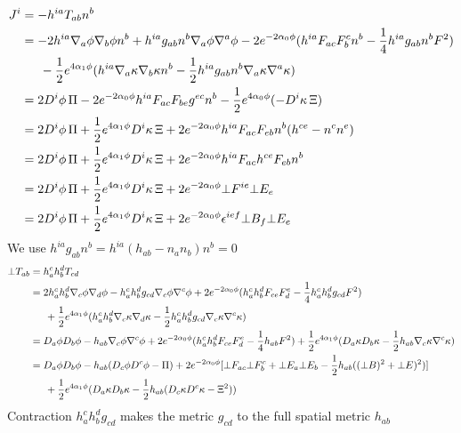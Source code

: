 \documentclass[prd]{revtex4}
\begin{document}
\begin{align}
J^i &= -h^{ia} T_{ab} n^b \nonumber \\
     &= - 2 h^{ia} \nabla_a \phi \nabla_b \phi n^b  + h^{ia} g_{ab} n^b \nabla_a \phi \nabla^a \phi - 2 e^{-2 \alpha_0 \phi} ( h^{ia} F_{ac} F_b^c n^b -\frac{1}{4} h^{ia} g_{ab} n^b F^2) \nonumber \\
     &\indent - \frac{1}{2} e^{4 \alpha_1 \phi} (h^{ia} \nabla_a \kappa \nabla_b \kappa n^b -\frac{1}{2} h^{ia} g_{ab} n^b \nabla_a \kappa \nabla^a \kappa) \nonumber \\
     &= 2 D^i \phi \, \Pi - 2 e^{-2 \alpha_0 \phi}  h^{ia} F_{ac} F_{be} g^{ec} n^b - \frac{1}{2} e^{4 \alpha_0 \phi} (- D^i \kappa \, \Xi) \nonumber \\     
          &= 2 D^i \phi\,  \Pi + \frac{1}{2} e^{4 \alpha_1 \phi} D^i \kappa \, \Xi + 2 e^{-2 \alpha_0 \phi}  h^{ia} F_{ac} F_{eb} n^b (h^{ce} - n^c n^e) \nonumber \\     
          &= 2 D^i \phi \, \Pi + \frac{1}{2} e^{4 \alpha_1 \phi} D^i \kappa \, \Xi + 2 e^{-2 \alpha_0 \phi}  h^{ia} F_{ac} h^{ce}  F_{eb} n^b \nonumber \\
          &= 2 D^i \phi \, \Pi + \frac{1}{2} e^{4 \alpha_1 \phi} D^i \kappa \, \Xi + 2 e^{-2 \alpha_0 \phi}  \bot F^{ie} \bot E_e \nonumber \\
                    &= 2 D^i \phi \,\Pi + \frac{1}{2} e^{4 \alpha_1 \phi} D^i \kappa \, \Xi + 2 e^{-2 \alpha_0 \phi}  \epsilon^{ief} \bot B_{f} \bot E_e 
\end{align}
We use $h^{ia} g_{ab} n^b = h^{ia} (h_{ab} - n_a n_b) n^b =0$
\begin{align}
\bot T_{ab} &= h_a^c h_b^d T_{cd} \nonumber \\
	          &=2 h_a^c h_b^d \nabla_c \phi \nabla_d \phi - h_a^c h_b^d g_{cd} \nabla_c \phi \nabla^c \phi + 2 e^{-2 \alpha_0 \phi} ( h_a^c h_b^d F_{ce} F_d^e -\frac{1}{4} h_a^c h_b^d g_{cd} F^2) \nonumber \\
	          &\indent +\frac{1}{2} e^{4 \alpha_1 \phi} (h_a^c h_b^d \nabla_c \kappa \nabla_d \kappa -\frac{1}{2} h_a^c h_b^d g_{cd} \nabla_c \kappa \nabla^c \kappa) \nonumber \\
	          &= D_a \phi D_b \phi - h_{ab} \nabla_c \phi \nabla^c \phi + 2 e^{-2 \alpha_0 \phi} ( h_a^c h_b^d F_{ce} F_d^e -\frac{1}{4} h_{ab} F^2) +\frac{1}{2} e^{4 \alpha_1 \phi} (D_a \kappa D_b \kappa -\frac{1}{2} h_{ab} \nabla_c \kappa \nabla^c \kappa) \nonumber \\
	          &= D_a \phi D_b \phi - h_{ab} (D_c \phi D^c \phi - \Pi) + 2 e^{-2 \alpha_0 \phi} [ \bot F_{ac} \bot F_b^c + \bot E_a \bot E_b  -\frac{1}{2} h_{ab}( (\bot B)^2 + \bot E)^2)] \nonumber \\
	          &\indent +\frac{1}{2} e^{4 \alpha_1 \phi} (D_a \kappa D_b \kappa -\frac{1}{2} h_{ab} (D_c \kappa D^c \kappa - \Xi^2)) 
\end{align}
Contraction $h_a^c h_b^d g_{cd}$ makes the metric $g_{cd}$ to the full spatial metric $h_{ab}$
\end{document}
